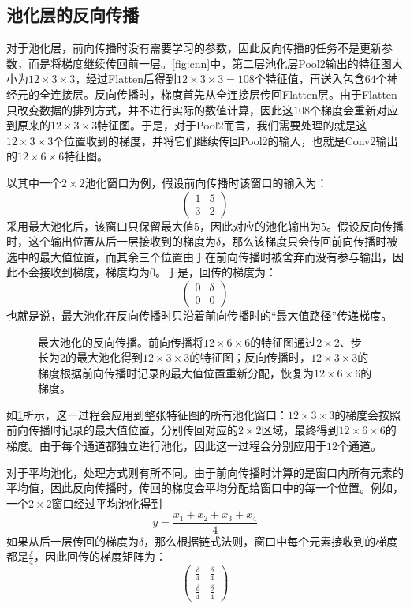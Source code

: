 \subsection{池化层的反向传播}

对于池化层，前向传播时没有需要学习的参数，因此反向传播的任务不是更新参数，而是将梯度继续传回前一层。\cref{fig:cnn}中，第二层池化层Pool2输出的特征图大小为$12\times3\times3$，经过Flatten后得到$12\times3\times3=108$个特征值，再送入包含$64$个神经元的全连接层。反向传播时，梯度首先从全连接层传回Flatten层。由于Flatten只改变数据的排列方式，并不进行实际的数值计算，因此这$108$个梯度会重新对应到原来的$12\times3\times3$特征图。于是，对于Pool2而言，我们需要处理的就是这$12\times3\times3$个位置收到的梯度，并将它们继续传回Pool2的输入，也就是Conv2输出的$12\times6\times6$特征图。

以其中一个$2\times2$池化窗口为例，假设前向传播时该窗口的输入为：
$$
\begin{pmatrix}
1&5\\
3&2
\end{pmatrix}
$$
采用最大池化后，该窗口只保留最大值$5$，因此对应的池化输出为$5$。假设反向传播时，这个输出位置从后一层接收到的梯度为$\delta$，那么该梯度只会传回前向传播时被选中的最大值位置，而其余三个位置由于在前向传播时被舍弃而没有参与输出，因此不会接收到梯度，梯度均为$0$。于是，回传的梯度为：
$$
\begin{pmatrix}
0&\delta\\
0&0
\end{pmatrix}
$$
也就是说，最大池化在反向传播时只沿着前向传播时的“最大值路径”传递梯度。

\begin{figure}[H]
    \caption{最大池化的反向传播。前向传播将$12\times6\times6$的特征图通过$2\times2$、步长为$2$的最大池化得到$12\times3\times3$的特征图；反向传播时，$12\times3\times3$的梯度根据前向传播时记录的最大值位置重新分配，恢复为$12\times6\times6$的梯度。}
    \label{fig:bp_pooling}
\end{figure}

如\cref{fig:bp_pooling}所示，这一过程会应用到整张特征图的所有池化窗口：$12\times3\times3$的梯度会按照前向传播时记录的最大值位置，分别传回对应的$2\times2$区域，最终得到$12\times6\times6$的梯度。由于每个通道都独立进行池化，因此这一过程会分别应用于$12$个通道。

对于平均池化，处理方式则有所不同。由于前向传播时计算的是窗口内所有元素的平均值，因此反向传播时，传回的梯度会平均分配给窗口中的每一个位置。例如，一个$2\times2$窗口经过平均池化得到
$$
y=\frac{x_1+x_2+x_3+x_4}{4}
$$
如果从后一层传回的梯度为$\delta$，那么根据链式法则，窗口中每个元素接收到的梯度都是$\frac{\delta}{4}$，因此回传的梯度矩阵为：
$$
\begin{pmatrix}
\frac{\delta}{4}&\frac{\delta}{4}\\
\frac{\delta}{4}&\frac{\delta}{4}
\end{pmatrix}
$$


